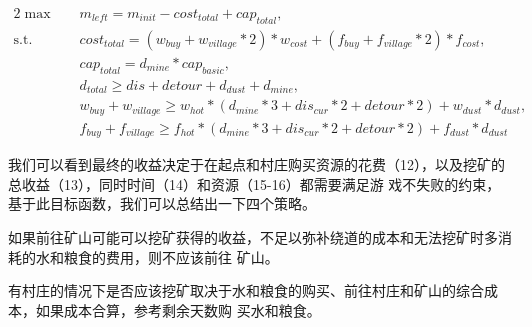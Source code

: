 \documentclass[withoutpreface,bwprint]{cumcmthesis} %
\begin{document}
\begin{alignat}{2}
    \max \quad & m_{left} = m_{init} - cost_{total} + cap_{total}, \\
    \mbox{s.t.}\quad
    &cost_{total} = (w_{buy}+w_{village}*2)*w_{cost} + (f_{buy}+f_{village}*2)*f_{cost},  \\ 
    &cap_{total} = d_{mine}*cap_{basic} ,\\ %
    &d_{total} \geq dis + detour + d_{dust} + d_{mine}, \\ %
    &w_{buy}+w_{village} \geq w_{hot}*(d_{mine}*3+dis_{cur}*2+detour*2) + w_{dust}*d_{dust}, \\ %
    &f_{buy}+f_{village} \geq f_{hot}*(d_{mine}*3+dis_{cur}*2+detour*2) + f_{dust}*d_{dust} %
\end{alignat}

我们可以看到最终的收益决定于在起点和村庄购买资源的花费（12），以及挖矿的总收益（13），同时时间（14）和资源（15-16）都需要满足游
戏不失败的约束，基于此目标函数，我们可以总结出一下四个策略。


\begin{route}
    如果前往矿山可能可以挖矿获得的收益，不足以弥补绕道的成本和无法挖矿时多消耗的水和粮食的费用，则不应该前往
    矿山。
    \label{route:choose}
\end{route}

\begin{route}
    有村庄的情况下是否应该挖矿取决于水和粮食的购买、前往村庄和矿山的综合成本，如果成本合算，参考剩余天数购
    买水和粮食。
    \label{route:country}
\end{route}
\end{document}
